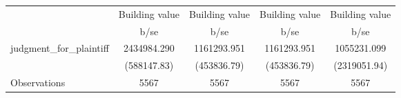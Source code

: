 {
\def\sym#1{\ifmmode^{#1}\else\(^{#1}\)\fi}
\begin{tabular}{l*{4}{c}}
\toprule
                    &\multicolumn{1}{c}{\hspace{0.25cm}Building value}&\multicolumn{1}{c}{\hspace{0.25cm}Building value}&\multicolumn{1}{c}{\hspace{0.25cm}Building value}&\multicolumn{1}{c}{\hspace{0.25cm}Building value}\\
                    &        b/se&        b/se&        b/se&        b/se\\
\midrule
judgment\_for\_plaintiff& 2434984.290& 1161293.951& 1161293.951& 1055231.099\\
                    & (588147.83)& (453836.79)& (453836.79)&(2319051.94)\\
\midrule
Observations        &        5567&        5567&        5567&        5567\\
\bottomrule
\end{tabular}
}
